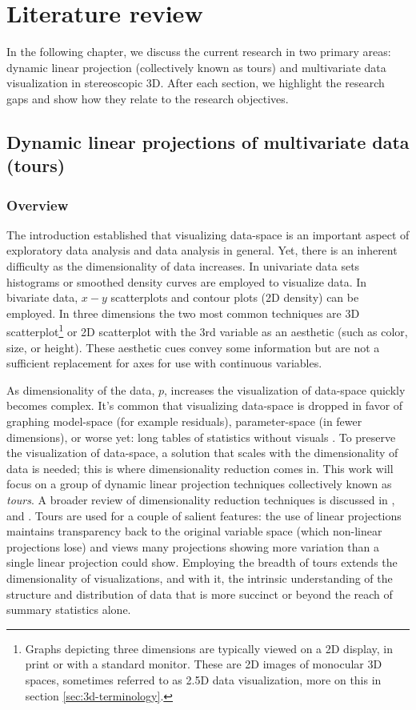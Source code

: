 \documentclass{monashthesis}
\begin{document}
\chapter{Literature review}\label{ch:lit_review}

In the following chapter, we discuss the current research in two primary
areas: dynamic linear projection (collectively known as tours) and
multivariate data visualization in stereoscopic 3D. After each section,
we highlight the research gaps and show how they relate to the research
objectives.

\section{Dynamic linear projections of multivariate data
(tours)}\label{sec:tour}

\subsection{Overview}\label{overview}

The introduction established that visualizing data-space is an important
aspect of exploratory data analysis and data analysis in general. Yet,
there is an inherent difficulty as the dimensionality of data increases.
In univariate data sets histograms or smoothed density curves are
employed to visualize data. In bivariate data, \(x-y\) scatterplots and
contour plots (2D density) can be employed. In three dimensions the two
most common techniques are 3D
scatterplot\footnote{Graphs depicting three dimensions are typically viewed on a 2D display, in print or with a standard monitor. These are 2D images of monocular 3D spaces, sometimes referred to as 2.5D data visualization, more on this in section \ref{sec:3d-terminology}.}
or 2D scatterplot with the 3rd variable as an aesthetic (such as color,
size, or height). These aesthetic cues convey some information but are
not a sufficient replacement for axes for use with continuous variables.

As dimensionality of the data, \(p\), increases the visualization of
data-space quickly becomes complex. It's common that visualizing
data-space is dropped in favor of graphing model-space (for example
residuals), parameter-space (in fewer dimensions), or worse yet: long
tables of statistics without visuals
\autocite{wickham_visualizing_2015}. To preserve the visualization of
data-space, a solution that scales with the dimensionality of data is
needed; this is where dimensionality reduction comes in. This work will
focus on a group of dynamic linear projection techniques collectively
known as \emph{tours}. A broader review of dimensionality reduction
techniques is discussed in \textcite{grinstein_high-dimensional_2002},
and \textcite{heer_tour_2010}. Tours are used for a couple of salient
features: the use of linear projections maintains transparency back to
the original variable space (which non-linear projections lose) and
views many projections showing more variation than a single linear
projection could show. Employing the breadth of tours extends the
dimensionality of visualizations, and with it, the intrinsic
understanding of the structure and distribution of data that is more
succinct or beyond the reach of summary statistics alone.
\end{document}
